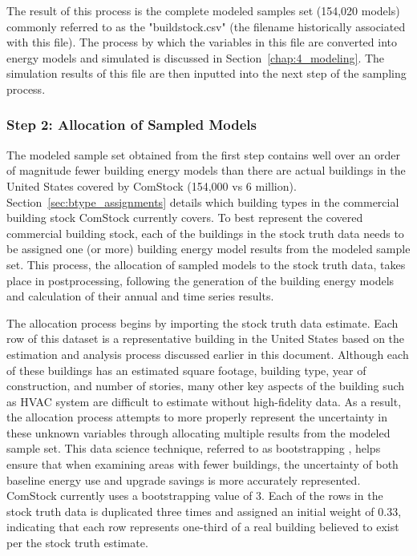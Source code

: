 The result of this process is the complete modeled samples set (154,020 models) commonly referred to as the "buildstock.csv" (the filename historically associated with this file). The process by which the variables in this file are converted into energy models and simulated is discussed in Section~\ref{chap:4_modeling}. The simulation results of this file are then inputted into the next step of the sampling process.

\subsubsection{Step 2: Allocation of Sampled Models}
The modeled sample set obtained from the first step contains well over an order of magnitude fewer building energy models than there are actual buildings in the United States covered by ComStock (154,000 vs 6 million). Section~\ref{sec:btype_assignments} details which building types in the commercial building stock ComStock currently covers. To best represent the covered commercial building stock, each of the buildings in the stock truth data needs to be assigned one (or more) building energy model results from the modeled sample set. This process, the allocation of sampled models to the stock truth data, takes place in postprocessing, following the generation of the building energy models and calculation of their annual and time series results.

The allocation process begins by importing the stock truth data estimate. Each row of this dataset is a representative building in the United States based on the estimation and analysis process discussed earlier in this document. Although each of these buildings has an estimated square footage, building type, year of construction, and number of stories, many other key aspects of the building such as HVAC system are difficult to estimate without high-fidelity data. As a result, the allocation process attempts to more properly represent the uncertainty in these unknown variables through allocating multiple results from the modeled sample set. This data science technique, referred to as bootstrapping , helps ensure that when examining areas with fewer buildings, the uncertainty of both baseline energy use and upgrade savings is more accurately represented. ComStock currently uses a bootstrapping value of 3. Each of the rows in the stock truth data is duplicated three times and assigned an initial weight of 0.33, indicating that each row represents one-third of a real building believed to exist per the stock truth estimate.

